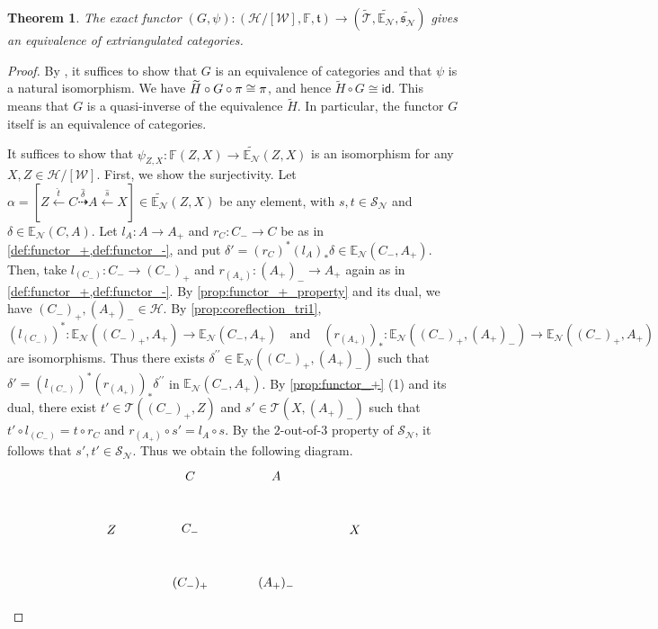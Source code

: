 \documentclass[a4paper,reqno,10pt]{amsart}
\DeclareRobustCommand{\darkblueedit}[1]{#1}
\newtheorem{theorem}{Theorem}[subsection]
\theoremstyle{definition}
\theoremstyle{definition}
\theoremstyle{definition}
\theoremstyle{definition}
\theoremstyle{plain}
\newcommand{\id}{\mathsf{id}}
\newcommand{\fs}{\mathfrak{s}}
\newcommand{\ft}{\mathfrak{t}}
\newcommand{\BE}{\mathbb{E}}
\newcommand{\BF}{\mathbb{F}}
\newcommand{\CH}{\mathcal{H}}
\newcommand{\CN}{\mathcal{N}}
\newcommand{\CT}{\mathcal{T}}
\newcommand{\CW}{\mathcal{W}}
\renewcommand{\SS}{\mathscr{S}}
\begin{document}
\begin{theorem}\label{thm:extri_heart}
The exact functor $(G,\psi)\colon (\CH/[\CW],\BF,\ft)\to(\widetilde{\CT},\widetilde{\BE_{\CN}},\widetilde{\fs_{\CN}})$ gives an equivalence of extriangulated categories.
\end{theorem}
\begin{proof}
By \cite[Proposition~2.13]{NOS22}, it suffices to show that $G$ is an equivalence of categories \darkblueedit{and that} $\psi$ is a natural isomorphism.
We have $\widetilde{H}\circ G\circ \textcolor{blue}{\pi}\cong \textcolor{blue}{\pi}$, and hence $\widetilde{H}\circ G\cong \id$. This means that $G$ is a quasi-inverse of the equivalence $\widetilde{H}$. In particular, the functor $G$ itself is an equivalence of categories.

\color{blue}
It suffices 
\normalcolor
to show that $\psi_{Z,X}\colon \BF(Z,X)\to \widetilde{\BE_{\CN}}(Z,X)$ \darkblueedit{is an isomorphism for any} $X,Z\in\CH/[\CW]$.
First, we show the surjectivity. 
\color{blue}
Let $\alpha=[Z\xleftarrow{\widehat{t}}C\overset{\widehat{\delta}}{\dashrightarrow}A\xleftarrow{\widehat{s}}X]\in\widetilde{\BE_{\CN}}(Z,X)$ be any element, with $s,t\in\SS_{\CN}$ and $\delta\in\BE_{\CN}(C,A)$.
Let $l_A\colon A\to A_+$ and $r_C\colon C_-\to C$ be as in \cref{def:functor_+,def:functor_-}, and put
$\delta'=(r_C)^{\ast}(l_A)_{\ast}\delta\in\BE_{\CN}(C_-,A_+)$.
Then, take $l_{(C_-)}\colon C_-\to (C_-)_+$ and $r_{(A_+)}\colon (A_+)_-\to A_+$ again as in \cref{def:functor_+,def:functor_-}. 
By \cref{prop:functor_+_property} and its dual, we have $(C_-)_+,(A_+)_-\in\CH$.
By \cref{prop:coreflection_tri1},
\[
(l_{(C_-)})^{\ast}\colon\BE_{\CN}((C_-)_+,A_+)\to\BE_{\CN}(C_-,A_+)
\quad\text{and}\quad
(r_{(A_+)})_{\ast}\colon\BE_{\CN}((C_-)_+,(A_+)_-)\to\BE_{\CN}((C_-)_+,A_+)
\]
are isomorphisms. Thus there exists $\delta^{\prime\prime}\in\BE_{\CN}((C_-)_+,(A_+)_-)$ 
such that $\delta'=(l_{(C_-)})^{\ast}(r_{(A_+)})_{\ast}\delta^{\prime\prime}$ in $\BE_{\CN}(C_-,A_+)$. By \cref{prop:functor_+} {\rm (1)} and its dual, there exist $t'\in\CT((C_-)_+,Z)$ and $s'\in\CT(X,(A_+)_-)$ such that $t'\circ l_{(C_-)}=t\circ r_C$ and $r_{(A_+)}\circ s'=l_A\circ s$.
By the $2$-out-of-$3$ property of $\SS_{\CN}$,
it follows that $s',t'\in\SS_{\CN}$.
Thus we obtain the following diagram.
\[
\begin{tikzpicture}[>=stealth]
\node (1) at (-1.2,0) {$C_-$};
\node (2) at (-1.2,1.5) {$C$};
\node (3) at (-1.2,-1.5) {$(C_-)_+$};
\node (4) at (-3.4,0) {$Z$};
\node (5) at (3.4,0) {$X$};
\node (6) at (1.2,1.5) {$A$};
\node (7) at (1.2,-1.5) {$(A_+)_-$};

\end{tikzpicture}\]
\end{proof}
\end{document}
